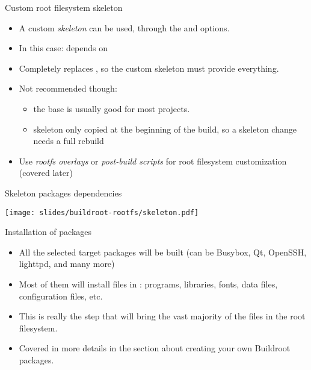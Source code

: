 \begin{frame}{Custom root filesystem skeleton}
  \begin{itemize}
  \item A custom {\em skeleton} can be used, through the
     and
     options.
  \item In this case:  depends on
  \item Completely replaces , so the custom
    skeleton must provide everything.
  \item Not recommended though:
    \begin{itemize}
    \item the base is usually good for most projects.
    \item skeleton only copied at the beginning of the build, so a
      skeleton change needs a full rebuild
    \end{itemize}
  \item Use {\em rootfs overlays} or {\em post-build scripts} for
    root filesystem customization (covered later)
  \end{itemize}
\end{frame}

\begin{frame}{Skeleton packages dependencies}
  \begin{center}
    \texttt{[image: slides/buildroot-rootfs/skeleton.pdf]}
  \end{center}
\end{frame}

\begin{frame}{Installation of packages}
  \begin{itemize}
  \item All the selected target packages will be built (can be
    Busybox, Qt, OpenSSH, lighttpd, and many more)
  \item Most of them will install files in :
    programs, libraries, fonts, data files, configuration files, etc.
  \item This is really the step that will bring the vast majority of
    the files in the root filesystem.
  \item Covered in more details in the section about creating your own
    Buildroot packages.
  \end{itemize}
\end{frame}

